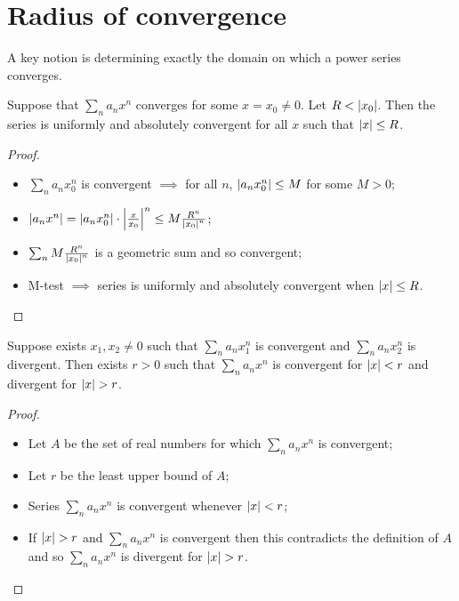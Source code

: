 \section{Radius of convergence}

A key notion is determining exactly the domain on which a power series converges.

\begin{theorem}
  Suppose that \(\sum_{n}a_n x^n\) converges for some \(x=x_0 \neq 0\).
  Let \(R<\left|x_0\right|\).
  Then the series is uniformly and absolutely convergent for all \(x\) such that \(\left|x\right|\leq R\).
\end{theorem}

\begin{proof}
  \begin{itemize}
    \item \(\sum_n a_n x_0^n\) is convergent \(\implies\) for all \(n\), \(\left|a_n x_0^n\right| \leq M\) for some \(M>0\);
    \item \(\left|a_n x^n\right| = \left|a_n x_0^n\right| \cdot \left|\frac{x}{x_0}\right|^n \leq M \frac{R^n}{\left|x_0\right|^n}\);
    \item \(\sum_n M \frac{R^n}{\left|x_0\right|^n}\) is a geometric sum and so convergent;
    \item M-test \(\implies\) series is uniformly and absolutely convergent when \(\left|x\right|\leq R\).  \qedhere
  \end{itemize}
\end{proof}




\begin{theorem}
  Suppose exists  \(x_1,x_2 \neq 0\) such that \(\sum_n a_n x_1^n\) is convergent and \(\sum_n a_n x_2^n\) is divergent.
  Then exists \(r>0\) such that \(\sum_n a_n x^n\) is convergent for \(\left|x\right|<r\) and divergent for \(\abs{x}>r\).
\end{theorem}

\begin{proof}
  \begin{itemize}
    \item Let \(A\) be the set of real numbers for which \(\sum_n a_n x^n\) is convergent;
    \item Let \(r\) be the least upper bound of \(A\);
    \item Series  \(\sum_n a_n x^n\) is convergent whenever \(\left|x\right|<r\);
    \item If \(\abs{x}>r\) and \(\sum_n a_n x^n\) is convergent then this contradicts the definition of \(A\) and so  \(\sum_n a_n x^n\) is divergent for \(\abs{x}>r\). \qedhere
  \end{itemize}
\end{proof}



